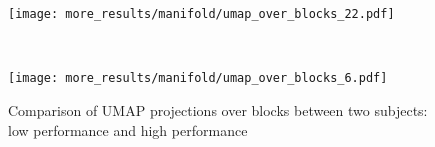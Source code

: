 \documentclass[../main.tex]{subfiles}
\begin{document}
\begin{figure}[tph]
  \centering
  \begin{minipage}{\textwidth}
    \texttt{[image: more\_results/manifold/umap\_over\_blocks\_22.pdf]}
    \subcaption{}
  \end{minipage}\\%
  \begin{minipage}{\textwidth}
    \texttt{[image: more\_results/manifold/umap\_over\_blocks\_6.pdf]}
    \subcaption{}
  \end{minipage}
  \caption[Comparison of UMAP projections over blocks between two subjects]{Comparison of UMAP projections over blocks between two subjects: low performance and high performance}\label{fig:umap_over_blocks_comparison}
\end{figure}



\end{document}
